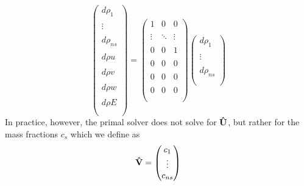 \documentclass{article}   	%
\begin{document}
\begin{equation}
  \begin{pmatrix}
 		d \rho_1    \\ \\
		  \vdots    \\ \\
		d \rho_{ns} \\ \\
		d \rho u    \\ \\
		d \rho v    \\ \\
		d \rho w    \\ \\
		d \rho E    \\ \\
	\end{pmatrix} =
  \begin{pmatrix}
    1      &    0    & 0      \\ \\
    \vdots & \ddots  & \vdots \\ \\
    0      &    0    & 1      \\ \\
    0      &    0    & 0      \\ \\
    0      &    0    & 0      \\ \\
    0      &    0    & 0      \\ \\
  \end{pmatrix}
  \begin{pmatrix}
 		d \rho_1    \\ \\
 		\vdots      \\ \\
    d \rho_{ns} \\ \\
	\end{pmatrix}
  \label{q-map2}
\end{equation}
In practice, however, the primal solver does not solve for $\mathbf{\hat{U}}$, but rather
for the mass fractions $c_s$ which we define as
\begin{equation}
  \mathbf{\hat{V}} = 
  \begin{pmatrix}
 		c_1    \\
 		\vdots \\
    c_{ns} \\
	\end{pmatrix}
  \label{mass-frac-vec}
\end{equation}
\end{document}
